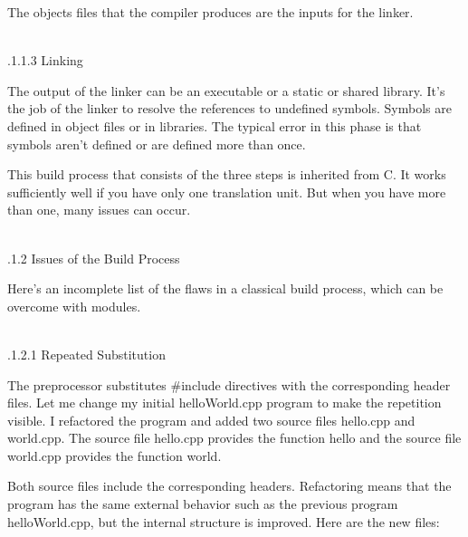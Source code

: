The objects files that the compiler produces are the inputs for the linker.

\hspace*{\fill} \\ %
.1.1.3\hspace{0.2cm} Linking

The output of the linker can be an executable or a static or shared library. It’s the job of the linker to resolve the references to undefined symbols. Symbols are defined in object files or in libraries. The typical error in this phase is that symbols aren’t defined or are defined more than once.

This build process that consists of the three steps is inherited from C. It works sufficiently well if you have only one translation unit. But when you have more than one, many issues can occur.

\hspace*{\fill} \\ %
.1.2\hspace{0.2cm} Issues of the Build Process

Here’s an incomplete list of the flaws in a classical build process, which can be overcome with modules.

\hspace*{\fill} \\ %
.1.2.1\hspace{0.2cm} Repeated Substitution

The preprocessor substitutes \#include directives with the corresponding header files. Let me change my initial helloWorld.cpp program to make the repetition visible. I refactored the program and added two source files hello.cpp and world.cpp. The source file hello.cpp provides the function hello and the source file world.cpp provides the function world.

Both source files include the corresponding headers. Refactoring means that the program has the same external behavior such as the previous program helloWorld.cpp, but the internal structure is improved. Here are the new files:

